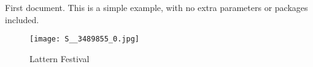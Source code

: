 \documentclass{article}
\begin{document}
First document. This is a simple example, with no 
extra parameters or packages included.
\begin{figure}
    \centering
    \texttt{[image: S\_\_3489855\_0.jpg]}
    \caption{Lattern Festival}
    \label{fig:enter-label}
\end{figure}
\end{document}
